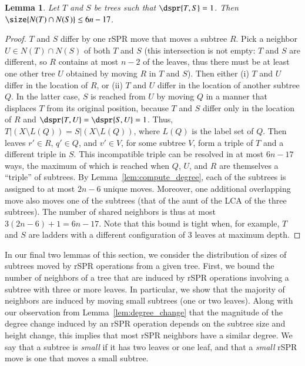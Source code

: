 \documentclass[]{elsarticle}
\newtheorem{lem}[thm]{Lemma}
\begin{document}
\begin{lem}
	\label{lem:shared_neighbors}
Let $T$ and $S$ be trees such that $\dspr{T,S} = 1$.
Then $\size{N(T) \cap N(S)} \le 6n - 17$.
\end{lem}
\begin{proof}
	$T$ and $S$ differ by one rSPR move that moves a subtree $R$.
	Pick a neighbor $U \in N(T) \cap N(S)$ of both $T$ and $S$ (this intersection is not empty: $T$ and $S$ are different, so $R$ contains at most $n-2$ of the leaves, thus there must be at least one other tree $U$ obtained by moving $R$ in $T$ and $S$).
	Then either (i) $T$ and $U$ differ in the location of $R$, or (ii) $T$ and $U$ differ in the location of another subtree $Q$.
	In the latter case, $S$ is reached from $U$ by moving $Q$ in a manner that displaces $T$ from its original position, because $T$ and $S$ differ only in the location of $R$ and $\dspr{T,U} = \dspr{S,U} = 1$.
	Thus, $T|(X \setminus L(Q)) = S|(X \setminus L(Q))$, where $L(Q)$ is the label set of $Q$. 
	Then leaves $r' \in R$, $q' \in Q$, and $v' \in V$, for some subtree $V$, form a triple of $T$ and a different triple in $S$.
	This incompatible triple can be resolved in at most $6n - 17$ ways, the maximum of which is reached when $Q$, $U$, and $R$ are themselves a ``triple'' of subtrees.
	By Lemma~\ref{lem:compute_degree}, each of the subtrees is assigned to at most $2n-6$ unique moves.
	Moreover, one additional overlapping move also moves one of the subtrees (that of the aunt of the LCA of the three subtrees).
	The number of shared neighbors is thus at most $3(2n-6) + 1 = 6n-17$.
	Note that this bound is tight when, for example, $T$ and $S$ are ladders with a different configuration of 3 leaves at maximum depth.
\end{proof}

In our final two lemmas of this section, we consider the distribution of sizes of subtrees moved by rSPR operations from a given tree.
First, we bound the number of neighbors of a tree that are induced by rSPR operations involving a subtree with three or more leaves.
In particular, we show that the majority of neighbors are induced by moving small subtrees (one or two leaves).
Along with our observation from Lemma~\ref{lem:degree_change} that the magnitude of the degree change induced by an rSPR operation depends on the subtree size and height change, this implies that most rSPR neighbors have a similar degree.
	We say that a subtree is \emph{small} if it has two leaves or one leaf, and that a \emph{small} rSPR move is one that moves a small subtree.
\end{document}
